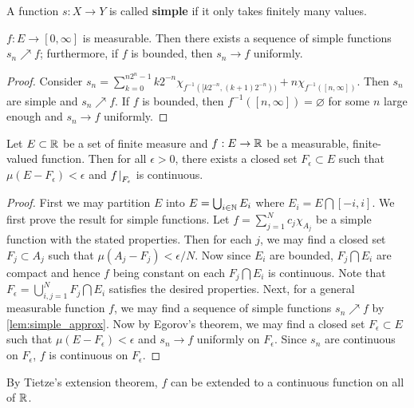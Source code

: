 \begin{definition}
    A function $s:X\to Y$ is called \textbf{simple} if it only takes 
    finitely many values.
\end{definition}

\begin{lemma}\label{lem:simple_approx}
    $f:E\to[0,\infty]$ is measurable. Then there exists a sequence 
    of simple functions $s_n\nearrow f$; furthermore, if $f$ is bounded, 
    then $s_n\to f$ uniformly.
\end{lemma}
\begin{proof}
    Consider $s_n = \sum_{k=0}^{n2^n-1} k2^{-n}\chi_{f^{-1}([k2^{-n},(k+1)2^{-n}))} 
    + n\chi_{f^{-1}([n,\infty])}$. Then $s_n$ are simple and $s_n\nearrow f$. 
    If $f$ is bounded, then $f^{-1}([n,\infty])=\varnothing$ for some $n$ 
    large enough and $s_n\to f$ uniformly.
\end{proof}

\begin{theorem}[Lusin]
    Let $E\subset\mathbb{R}$ be a set of finite measure and $f:E\to\mathbb{R}$ be a measurable, 
    finite-valued function. Then for all $\epsilon>0$, there exists a 
    closed set $F_\epsilon\subset E$ such that $\mu(E-F_\epsilon)<\epsilon$ 
    and $f\left.\hspace{-0.2em}\right|_{F_\epsilon}$ is continuous.
\end{theorem}
\begin{proof}
    First we may partition $E$ into $E = \bigcup_{i\in\mathbb{N}} E_i$ where $E_i = E\bigcap[-i,i]$. 
    We first prove the result for simple functions. Let $f = \sum_{j=1}^{N}c_j\chi_{A_j}$ 
    be a simple function with the stated properties. Then for each $j$, 
    we may find a closed set $F_j\subset A_j$ such that $\mu(A_j-F_j)<\epsilon/N$. 
    Now since $E_i$ are bounded, $F_j\bigcap E_i$ are compact and hence 
    $f$ being constant on each $F_j\bigcap E_i$ is continuous. Note that 
    $F_\epsilon = \bigcup_{i,j=1}^{N} F_j\bigcap E_i$ satisfies the desired 
    properties. Next, for a general measurable function $f$, we may find 
    a sequence of simple functions $s_n\nearrow f$ by \cref{lem:simple_approx}. 
    Now by Egorov's theorem, we may find a closed set $F_\epsilon\subset E$ such 
    that $\mu(E-F_\epsilon)<\epsilon$ and $s_n\to f$ uniformly on $F_\epsilon$. 
    Since $s_n$ are continuous on $F_\epsilon$, $f$ is continuous on $F_\epsilon$.
\end{proof}
\begin{remark}
    By Tietze's extension theorem, $f$ can be extended to a continuous 
    function on all of $\mathbb{R}$.
\end{remark}

